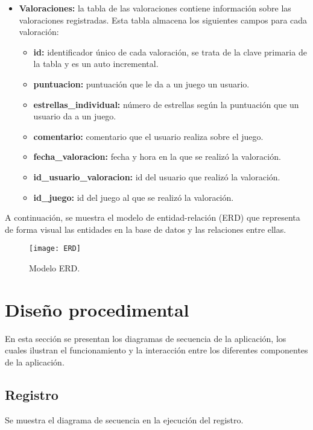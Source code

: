 \begin{itemize}
    \item \textbf{Valoraciones:} la tabla de las valoraciones contiene información sobre las valoraciones registradas. Esta tabla almacena los siguientes campos para cada valoración:
        \begin{itemize}
        \tightlist
            \item \textbf{id:} identificador único de cada valoración, se trata de la clave primaria de la tabla y es un auto incremental.
            \item \textbf{puntuacion:} puntuación que le da a un juego un usuario.
            \item \textbf{estrellas\_individual:} número de estrellas según la puntuación que un usuario da a un juego.
            \item \textbf{comentario:} comentario que el usuario realiza sobre el juego.
            \item \textbf{fecha\_valoracion:} fecha y hora en la que se realizó la valoración.
            \item \textbf{id\_usuario\_valoracion:} id del usuario que realizó la valoración.
            \item \textbf{id\_juego:} id del juego al que se realizó la valoración.
        \end{itemize}
\end{itemize}

A continuación, se muestra el modelo de entidad-relación (ERD) que representa de forma visual las entidades en la base de datos y las relaciones entre ellas.
\newpage

\begin{figure}[!h]
\centering
\texttt{[image: ERD]}
\caption{Modelo ERD.}
\label{fig:ERD}
\end{figure}

\newpage
\section{Diseño procedimental}
En esta sección se presentan los diagramas de secuencia de la aplicación, los cuales ilustran el funcionamiento y la interacción entre los diferentes componentes de la aplicación. 

\subsection{Registro}
Se muestra el diagrama de secuencia en la ejecución del registro.

